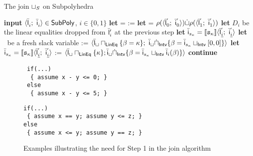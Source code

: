 \documentclass[sttt]{svjour}
\begin{document}
\begin{algorithm}[t]
\caption{The join $\sqcup_{S}$ on Subpolyhedra}
\label{alg:join}
\begin{algorithmic}
\STATE \textbf{input} $\langle \bar{\mathsf{\mathsf{l}}}_{i}^{};\ \bar{\mathsf{\mathsf{i}}}_{i}^{} \rangle \in \mathsf{SubPoly}$, $i \in \{0, 1\}$
\medskip
\STATE \textbf{let}  = 
\STATE
\smallskip
{}
\STATE  {} :=   
\ENDFOR
\STATE
\smallskip
{}
\STATE  \textbf{let}  \subpolyPair{\sqcup}{} = $\rho(\langle \bar{\mathsf{\mathsf{l}}}_{0}^{'};\ \bar{\mathsf{\mathsf{i}}}_{0}^{'} \rangle) \dot\sqcup   \rho(\langle \bar{\mathsf{\mathsf{l}}}_{1}^{'};\ \bar{\mathsf{\mathsf{i}}}_{1}^{'} \rangle)$
\STATE
\smallskip
{}
\STATE \textbf{let} $D_{i}$ be the linear equalities dropped from $\bar{\mathsf{\mathsf{l}}}'_i$ at the previous step
\STATE \textbf{let} $\bar{\mathsf{\mathsf{i}}}_{s_\kappa} = \llbracket \mathtt{s_\kappa} \rrbracket\langle \bar{\mathsf{\mathsf{l}}}_{\underline{i}}^{'};\ \bar{\mathsf{\mathsf{i}}}_{\underline{i}}^{'} \rangle$
\STATE \textbf{let} \slackvar\  be a fresh slack variable
\STATE \subpolyPair{\sqcup}{} := $\langle \bar{\mathsf{\mathsf{l}}}_\sqcup \sqcap_{\mathsf{LinEq}} \{ \beta_{} = \kappa\};\ \bar{\mathsf{\mathsf{i}}}_\sqcup \dot \sqcap_{\mathsf{Intv}} \{ \beta_{}= \bar{\mathsf{\mathsf{i}}}_{s_\kappa} \sqcup_{\mathsf{Intv}} [0,0]\} \rangle$ 
\ENDIF
{}
\STATE \textbf{let} $\bar{\mathsf{\mathsf{i}}}_{s_\kappa} = \llbracket \mathtt{s_\kappa} \rrbracket\langle \bar{\mathsf{\mathsf{l}}}_{\underline{i}}^{'};\ \bar{\mathsf{\mathsf{i}}}_{\underline{i}}^{'} \rangle$
\STATE  \subpolyPair{\sqcup}{} := $\langle \bar{\mathsf{\mathsf{l}}}_\sqcup \sqcap_{\mathsf{LinEq}} \{ \kappa\};\bar{\mathsf{\mathsf{i}}}_\sqcup \dot\sqcap_{\mathsf{Intv}} \{ \beta_{} = \bar{\mathsf{\mathsf{i}}}_{s_\kappa} \sqcup_{\mathsf{Intv}} \bar{\mathsf{\mathsf{i}}}_i(\beta_{})\} \rangle$  
\ENDIF
{}
\STATE \textbf{continue}
\ENDIF
\ENDFOR
\RETURN  \subpolyPair{\sqcup}{} 
\end{algorithmic}
\end{algorithm}


\begin{figure}%
  \begin{subfloat}
    \begin{minipage}{4cm}
\begin{verbatim}
 if(...) 
  { assume x - y <= 0; } 
 else 
  { assume x - y <= 5; }
\end{verbatim}
    \end{minipage}
\caption{}    
  \end{subfloat}    
\qquad
  \begin{subfloat}
    \begin{minipage}{6cm}
\begin{verbatim}
if(...) 
 { assume x == y; assume y <= z; } 
else 
 { assume x <= y; assume y == z; }   
\end{verbatim}
\caption{}
    \end{minipage}
  \end{subfloat}
\caption{Examples illustrating the need for Step 1 in the join algorithm }
\label{fig:example-join}
\end{figure}
\end{document}
